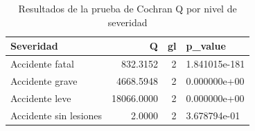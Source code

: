 \begin{table}[ht]
\centering
\begin{tabular}{lrrl}
  \hline
Severidad & Q & gl & p\_value \\ 
  \hline
Accidente fatal & 832.3152 &     2 & 1.841015e-181 \\ 
  Accidente grave & 4668.5948 &     2 &  0.000000e+00 \\ 
  Accidente leve & 18066.0000 &     2 &  0.000000e+00 \\ 
  Accidente sin lesiones & 2.0000 &     2 &  3.678794e-01 \\ 
   \hline
\end{tabular}
\caption{Resultados de la prueba de Cochran Q por nivel de severidad} 
\label{tab:cochran_q}
\end{table}
